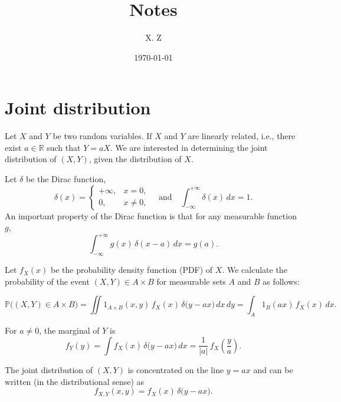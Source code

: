 \documentclass[a4paper, 12pt]{article}
\begin{document}
    \title{Notes}
    \author{X. Z}
    \date{\today}
    \maketitle

    \section{Joint distribution}

    Let $X$ and $Y$ be two random variables. If $X$ and $Y$ are linearly related, i.e., there exist $a\in \mathbb{R}$ such that $Y = aX$.
    We are interested in determining the joint distribution of $(X,Y)$, given the distribution of $X$.

    Let $\delta$ be the Dirac function,
    \[
      \delta(x)=\begin{cases}
        +\infty, & x=0,\\
        0, & x\neq 0,
      \end{cases}
      \quad\text{and}\quad
      \int_{-\infty}^{+\infty} \delta(x)\,dx=1.
    \]
    An important property of the Dirac function is that for any measurable function $g$,
    \[
      \int_{-\infty}^{+\infty} g(x)\,\delta(x-a)\,dx=g(a).
    \]  

    Let $f_X(x)$ be the probability density function (PDF) of $X$. We calculate the probability of the event $(X,Y) \in A \times B$ for measurable sets $A$ and $B$ as follows:

    \[
      \mathbb{P}\bigl((X,Y)\in A\times B\bigr)
      =\iint 1_{A\times B}(x,y)\, f_X(x)\,\delta\bigl(y-ax\bigr)\,dx\,dy
      =\int_A 1_B(ax)\, f_X(x)\,dx.
    \]
    
    For $a\neq 0$, the marginal of $Y$ is
    \[
      f_Y(y)=\int f_X(x)\,\delta\bigl(y-ax\bigr)\,dx
            =\frac{1}{|a|}\,f_X\!\left(\frac{y}{a}\right).
    \]

    The joint distribution of $(X,Y)$ is concentrated on the line $y=ax$ and can be written (in the distributional sense) as
    \[
      f_{X,Y}(x,y)=f_X(x)\,\delta\bigl(y-ax\bigr).
    \]

    
\end{document}
